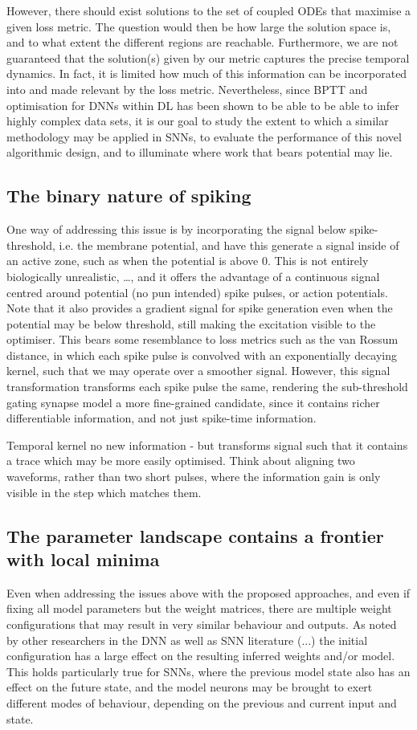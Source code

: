 \documentclass[mphil,deptreport,ai]{infthesis} %
\begin{document}
However, there should exist solutions to the set of coupled ODEs that maximise a given loss metric. The question would then be how large the solution space is, and to what extent the different regions are reachable. Furthermore, we are not guaranteed that the solution(s) given by our metric captures the precise temporal dynamics. In fact, it is limited how much of this information can be incorporated into and made relevant by the loss metric.
Nevertheless, since BPTT and optimisation for DNNs within DL has been shown to be able to be able to infer highly complex data sets, it is our goal to study the extent to which a similar methodology may be applied in SNNs, to evaluate the performance of this novel algorithmic design, and to illuminate where work that bears potential may lie.


\subsection{The binary nature of spiking}
One way of addressing this issue is by incorporating the signal below spike-threshold, i.e. the membrane potential, and have this generate a signal inside of an active zone, such as when the potential is above 0. This is not entirely biologically unrealistic, …, and it offers the advantage of a continuous signal centred around potential (no pun intended) spike pulses, or action potentials. Note that it also provides a gradient signal for spike generation even when the potential may be below threshold, still making the excitation visible to the optimiser.
This bears some resemblance to loss metrics such as the van Rossum distance, in which each spike pulse is convolved with an exponentially decaying kernel, such that we may operate over a smoother signal. However, this signal transformation transforms each spike pulse the same, rendering the sub-threshold gating synapse model a more fine-grained candidate, since it contains richer differentiable information, and not just spike-time information.

Temporal kernel no new information - but transforms signal such that it contains a trace which may be more easily optimised. Think about aligning two waveforms, rather than two short pulses, where the information gain is only visible in the step which matches them.


\subsection{The parameter landscape contains a frontier with local minima}
Even when addressing the issues above with the proposed approaches, and even if fixing all model parameters but the weight matrices, there are multiple weight configurations that may result in very similar behaviour and outputs.
As noted by other researchers in the DNN as well as SNN literature (...) the initial configuration has a large effect on the resulting inferred weights and/or model. This holds particularly true for SNNs, where the previous model state also has an effect on the future state, and the model neurons may be brought to exert different modes of behaviour, depending on the previous and current input and state.
\end{document}
